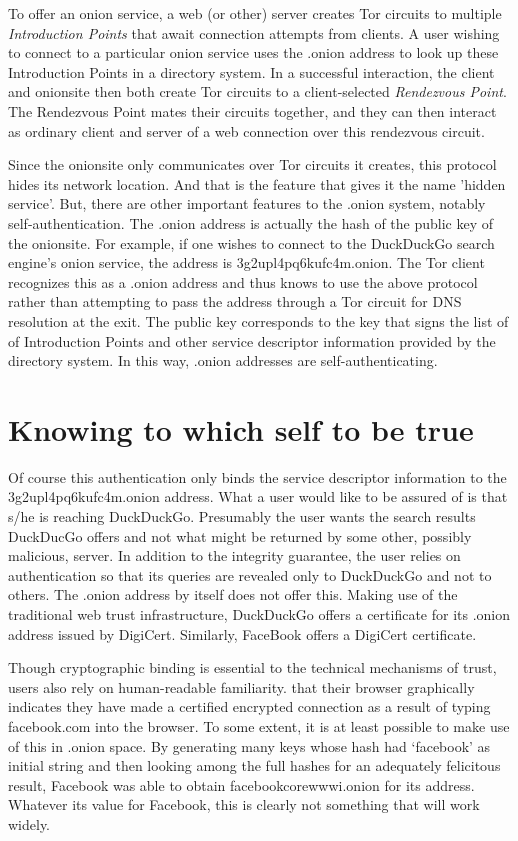 \documentclass[10pt, conference, compsocconf]{styles/IEEEtran}
\begin{document}
To offer an onion service, a web (or other) server creates Tor circuits to
multiple \emph{Introduction Points} that await connection attempts
from clients. A user wishing to connect to a particular onion service
uses the .onion address to look up these Introduction Points in a
directory system. In a successful interaction, the client and
onionsite then both create Tor circuits to a client-selected
\emph{Rendezvous Point}. The Rendezvous Point mates their circuits
together, and they can then interact as ordinary client and server of
a web connection over this rendezvous circuit.

Since the onionsite only communicates over Tor circuits it creates,
this protocol hides its network location. And that is the feature that
gives it the name 'hidden service'. But, there are other important
features to the .onion system, notably self-authentication. The .onion
address is actually the hash of the public key of the onionsite. For
example, if one wishes to connect to the DuckDuckGo search engine's
onion service, the address is 3g2upl4pq6kufc4m.onion. The Tor client
recognizes this as a .onion address and thus knows to use the above
protocol rather than attempting to pass the address through a Tor
circuit for DNS resolution at the exit. The public key
corresponds to the key that signs the list of of Introduction Points
and other service descriptor information provided by the directory
system. In this way, .onion addresses are self-authenticating.

\section{Knowing to which self to be true}

Of course this authentication only binds the service descriptor
information to the 3g2upl4pq6kufc4m.onion address. What a user would
like to be assured of is that s/he is reaching DuckDuckGo. Presumably
the user wants the search results DuckDucGo offers and not what might
be returned by some other, possibly malicious, server.  In addition to
the integrity guarantee, the user relies on authentication so that its
queries are revealed only to DuckDuckGo and not to others. The
.onion address by itself does not offer this.
Making use of the traditional web trust infrastructure, DuckDuckGo
offers a certificate for its .onion address issued by DigiCert.
Similarly, FaceBook offers a DigiCert certificate.

Though cryptographic binding is essential to the technical mechanisms
of trust, users also rely on human-readable familiarity. that their
browser graphically indicates they have made a certified encrypted
connection as a result of typing facebook.com into the browser.  To
some extent, it is at least possible to make use of this in .onion
space. By generating many keys whose hash had `facebook' as initial
string and then looking among the full hashes for an adequately
felicitous result, Facebook was able to obtain facebookcorewwwi.onion
for its address. Whatever its value for Facebook, this is clearly not
something that will work widely.
\end{document}
